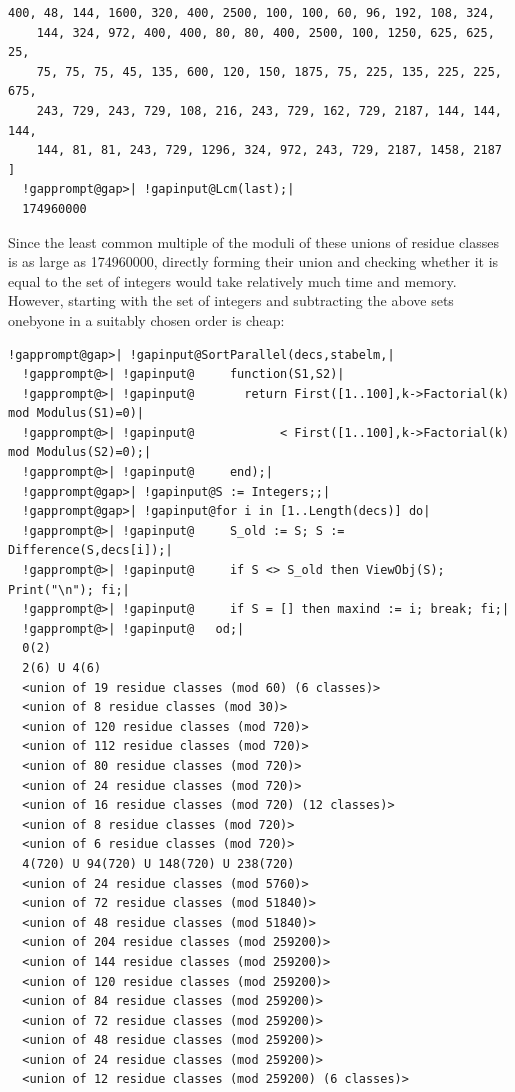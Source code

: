 \documentclass[a4paper,11pt]{report}
\begin{document}
{{\begin{Verbatim}[commandchars=!@|,fontsize=\small,frame=single,label=Example]
    400, 48, 144, 1600, 320, 400, 2500, 100, 100, 60, 96, 192, 108, 324, 
    144, 324, 972, 400, 400, 80, 80, 400, 2500, 100, 1250, 625, 625, 25, 
    75, 75, 75, 45, 135, 600, 120, 150, 1875, 75, 225, 135, 225, 225, 675, 
    243, 729, 243, 729, 108, 216, 243, 729, 162, 729, 2187, 144, 144, 144, 
    144, 81, 81, 243, 729, 1296, 324, 972, 243, 729, 2187, 1458, 2187 ]
  !gapprompt@gap>| !gapinput@Lcm(last);|
  174960000
\end{Verbatim}
 Since the least common multiple of the moduli of these unions of residue
classes is as large as 174960000, directly forming their union and checking
whether it is equal to the set of integers would take relatively much time and
memory. However, starting with the set of integers and subtracting the above
sets one\texttt{}by\texttt{}one in a suitably chosen
order is cheap: 
\begin{Verbatim}[commandchars=!@|,fontsize=\small,frame=single,label=Example]
  !gapprompt@gap>| !gapinput@SortParallel(decs,stabelm,|
  !gapprompt@>| !gapinput@     function(S1,S2)|
  !gapprompt@>| !gapinput@       return First([1..100],k->Factorial(k) mod Modulus(S1)=0)|
  !gapprompt@>| !gapinput@            < First([1..100],k->Factorial(k) mod Modulus(S2)=0);|
  !gapprompt@>| !gapinput@     end);|
  !gapprompt@gap>| !gapinput@S := Integers;;|
  !gapprompt@gap>| !gapinput@for i in [1..Length(decs)] do|
  !gapprompt@>| !gapinput@     S_old := S; S := Difference(S,decs[i]);|
  !gapprompt@>| !gapinput@     if S <> S_old then ViewObj(S); Print("\n"); fi;|
  !gapprompt@>| !gapinput@     if S = [] then maxind := i; break; fi;|
  !gapprompt@>| !gapinput@   od;|
  0(2)
  2(6) U 4(6)
  <union of 19 residue classes (mod 60) (6 classes)>
  <union of 8 residue classes (mod 30)>
  <union of 120 residue classes (mod 720)>
  <union of 112 residue classes (mod 720)>
  <union of 80 residue classes (mod 720)>
  <union of 24 residue classes (mod 720)>
  <union of 16 residue classes (mod 720) (12 classes)>
  <union of 8 residue classes (mod 720)>
  <union of 6 residue classes (mod 720)>
  4(720) U 94(720) U 148(720) U 238(720)
  <union of 24 residue classes (mod 5760)>
  <union of 72 residue classes (mod 51840)>
  <union of 48 residue classes (mod 51840)>
  <union of 204 residue classes (mod 259200)>
  <union of 144 residue classes (mod 259200)>
  <union of 120 residue classes (mod 259200)>
  <union of 84 residue classes (mod 259200)>
  <union of 72 residue classes (mod 259200)>
  <union of 48 residue classes (mod 259200)>
  <union of 24 residue classes (mod 259200)>
  <union of 12 residue classes (mod 259200) (6 classes)>

\end{Verbatim}}}
\end{document}
